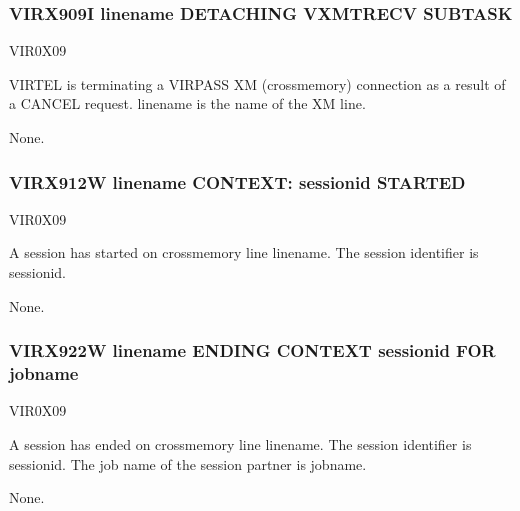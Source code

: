 \documentclass[letterpaper,10pt,english]{sphinxmanual}
\begin{document}
\subsubsection{VIRX909I linename DETACHING VXMTRECV SUBTASK}
\label{\detokenize{messages:virx909i-linename-detaching-vxmtrecv-subtask}}\begin{description}
\sphinxAtStartPar
VIR0X09

\sphinxAtStartPar
VIRTEL is terminating a VIRPASS XM (cross\sphinxhyphen{}memory) connection as a result of a CANCEL request. linename is the name of the XM line.

\sphinxAtStartPar
None.

\end{description}


\subsubsection{VIRX912W linename CONTEXT: sessionid STARTED}
\label{\detokenize{messages:virx912w-linename-context-sessionid-started}}\begin{description}
\sphinxAtStartPar
VIR0X09

\sphinxAtStartPar
A session has started on cross\sphinxhyphen{}memory line linename. The session identifier is sessionid.

\sphinxAtStartPar
None.

\end{description}


\subsubsection{VIRX922W linename ENDING CONTEXT sessionid FOR jobname}
\label{\detokenize{messages:virx922w-linename-ending-context-sessionid-for-jobname}}\begin{description}
\sphinxAtStartPar
VIR0X09

\sphinxAtStartPar
A session has ended on cross\sphinxhyphen{}memory line linename. The session identifier is sessionid. The job name of the session partner is jobname.

\sphinxAtStartPar
None.

\end{description}
\end{document}
